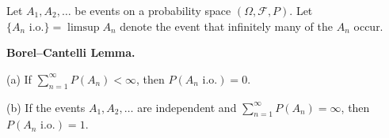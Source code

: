 Let $A_1, A_2, \ldots$ be events on a probability space $(\Omega, \mathcal{F}, P)$. Let $\{A_n \text{ i.o.}\} = \limsup A_n$ denote the event that infinitely many of the $A_n$ occur.

\textbf{Borel–Cantelli Lemma.}

(a) If $\sum_{n=1}^{\infty} P(A_n) < \infty$, then $P(A_n \text{ i.o.}) = 0$.

(b) If the events $A_1, A_2, \ldots$ are independent and $\sum_{n=1}^{\infty} P(A_n) = \infty$, then $P(A_n \text{ i.o.}) = 1$.
